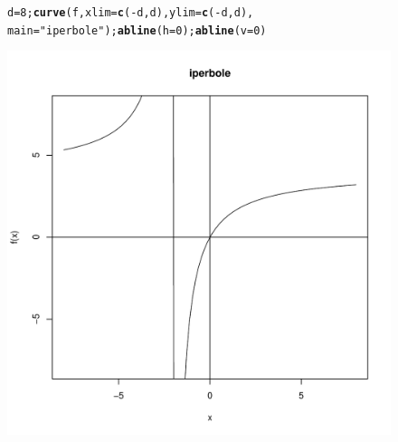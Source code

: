 \documentclass[onecolumn,11pt]{book}\usepackage[]{graphicx}\usepackage[]{color}
\makeatletter
\def\maxwidth{ %
  \ifdim\Gin@nat@width>\linewidth
    \linewidth
  \else
    \Gin@nat@width
  \fi
}
\newcommand{\hlnum}[1]{\textcolor[rgb]{0.686,0.059,0.569}{#1}}%
\newcommand{\hlstr}[1]{\textcolor[rgb]{0.192,0.494,0.8}{#1}}%
\newcommand{\hlopt}[1]{\textcolor[rgb]{0,0,0}{#1}}%
\newcommand{\hlstd}[1]{\textcolor[rgb]{0.345,0.345,0.345}{#1}}%
\newcommand{\hlkwb}[1]{\textcolor[rgb]{0.69,0.353,0.396}{#1}}%
\newcommand{\hlkwc}[1]{\textcolor[rgb]{0.333,0.667,0.333}{#1}}%
\newcommand{\hlkwd}[1]{\textcolor[rgb]{0.737,0.353,0.396}{\textbf{#1}}}%
\newenvironment{kframe}{%
 \def\at@end@of@kframe{}%
 \ifinner\ifhmode%
  \def\at@end@of@kframe{\end{minipage}}%
  \begin{minipage}{\columnwidth}%
 \fi\fi%
 \def\FrameCommand##1{\hskip\@totalleftmargin \hskip-\fboxsep
 \colorbox{shadecolor}{##1}\hskip-\fboxsep
     \hskip-\linewidth \hskip-\@totalleftmargin \hskip\columnwidth}%
 \MakeFramed {\advance\hsize-\width
   \@totalleftmargin\z@ \linewidth\hsize
   \@setminipage}}%
 {\par\unskip\endMakeFramed%
 \at@end@of@kframe}
\newenvironment{knitrout}{}{} %
\makeatother
\begin{document}
\begin{figure}
\begin{knitrout}
\color{fgcolor}\begin{kframe}
\begin{alltt}
\hlstd{d}\hlkwb{=}\hlnum{8}\hlstd{;}\hlkwd{curve}\hlstd{(f,}\hlkwc{xlim}\hlstd{=}\hlkwd{c}\hlstd{(}\hlopt{-}\hlstd{d,d),}\hlkwc{ylim}\hlstd{=}\hlkwd{c}\hlstd{(}\hlopt{-}\hlstd{d,d),}
\hlkwc{main}\hlstd{=}\hlstr{"iperbole"}\hlstd{);} \hlkwd{abline}\hlstd{(}\hlkwc{h}\hlstd{=}\hlnum{0}\hlstd{);}\hlkwd{abline}\hlstd{(}\hlkwc{v}\hlstd{=}\hlnum{0}\hlstd{)}
\end{alltt}
\end{kframe}
\includegraphics[width=\maxwidth]{figure/unnamed-chunk-109-1} 

\end{knitrout}
\end{figure}
\end{document}
